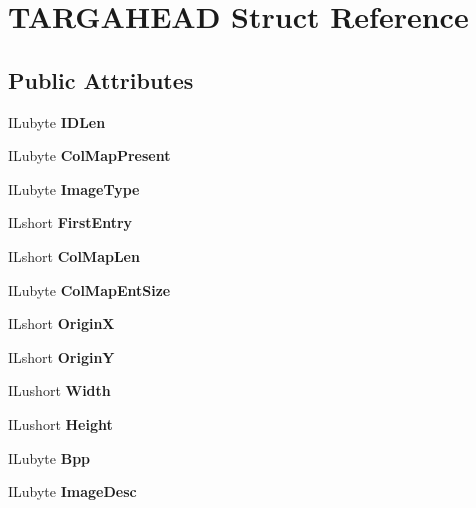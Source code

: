 \hypertarget{structTARGAHEAD}{}\section{T\+A\+R\+G\+A\+H\+E\+AD Struct Reference}
\label{structTARGAHEAD}
\subsection*{Public Attributes}
\begin{DoxyCompactItemize}
\item 
\mbox{\label{structTARGAHEAD_a9e79ac95b2016095ac5860a67a77f498}} 
I\+Lubyte {\bfseries I\+D\+Len}
\item 
\mbox{\label{structTARGAHEAD_a1c8d9110bcc27a4bfba1cf5715a48eea}} 
I\+Lubyte {\bfseries Col\+Map\+Present}
\item 
\mbox{\label{structTARGAHEAD_a320c43cae9bfcebb265758a3b3ed8c77}} 
I\+Lubyte {\bfseries Image\+Type}
\item 
\mbox{\label{structTARGAHEAD_a7e3d94f636cb5e928974924d39d49415}} 
I\+Lshort {\bfseries First\+Entry}
\item 
\mbox{\label{structTARGAHEAD_ac03d3565cb9ccf73dcb16f12547e8203}} 
I\+Lshort {\bfseries Col\+Map\+Len}
\item 
\mbox{\label{structTARGAHEAD_ab50dfb80335ba07f130d306995b6c8b3}} 
I\+Lubyte {\bfseries Col\+Map\+Ent\+Size}
\item 
\mbox{\label{structTARGAHEAD_a6fb4430e795c9dbf31547ad47e6334f6}} 
I\+Lshort {\bfseries OriginX}
\item 
\mbox{\label{structTARGAHEAD_a89179f8bada6f43e43a1bc34b9cae410}} 
I\+Lshort {\bfseries OriginY}
\item 
\mbox{\label{structTARGAHEAD_a40dbcd9ad3a763d6e508040c39ca88ea}} 
I\+Lushort {\bfseries Width}
\item 
\mbox{\label{structTARGAHEAD_a49f8a109313c55423b4b60e5dce6b534}} 
I\+Lushort {\bfseries Height}
\item 
\mbox{\label{structTARGAHEAD_a2044816beeb48ada1f467680b4625eb1}} 
I\+Lubyte {\bfseries Bpp}
\item 
\mbox{\label{structTARGAHEAD_a3423f9a31c25288e6520e3d0fc432633}} 
I\+Lubyte {\bfseries Image\+Desc}
\end{DoxyCompactItemize}


